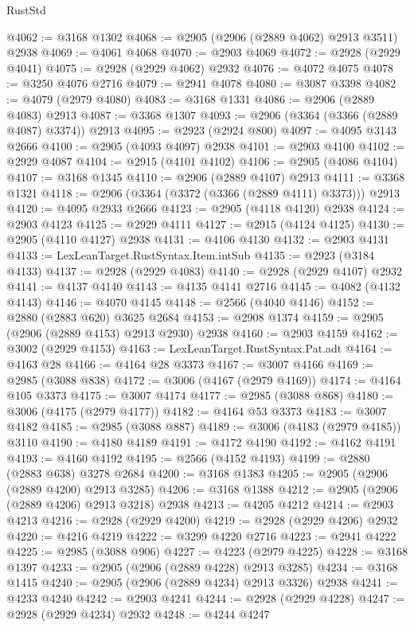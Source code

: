 \begin{lexlean}{RustStd}
\begin{coremodule}
{\begin{coremodule}
{{{{{{{{{{{{{{{{{{{{{{{{{{{{{{{{{{{{{{{{{{{{{{{{{{{{{{{{{{{{{{{{{{{{{{{{{{{{{{@4062 := @3168 @1302
@4068 := @2905 (@2906 (@2889 @4062) @2913 @3511) @2938
@4069 := @4061 @4068
@4070 := @2903 @4069
@4072 := @2928 (@2929 @4041)
@4075 := @2928 (@2929 @4062) @2932
@4076 := @4072 @4075
@4078 := @3250 @4076 @2716
@4079 := @2941 @4078
@4080 := @3087 @3398
@4082 := @4079 (@2979 @4080)
@4083 := @3168 @1331
@4086 := @2906 (@2889 @4083) @2913
@4087 := @3368 @1307
@4093 := @2906 (@3364 (@3366 (@2889 @4087) @3374)) @2913
@4095 := @2923 (@2924 @800)
@4097 := @4095 @3143 @2666
@4100 := @2905 (@4093 @4097) @2938
@4101 := @2903 @4100
@4102 := @2929 @4087
@4104 := @2915 (@4101 @4102)
@4106 := @2905 (@4086 @4104)
@4107 := @3168 @1345
@4110 := @2906 (@2889 @4107) @2913
@4111 := @3368 @1321
@4118 := @2906 (@3364 (@3372 (@3366 (@2889 @4111) @3373))) @2913
@4120 := @4095 @2933 @2666
@4123 := @2905 (@4118 @4120) @2938
@4124 := @2903 @4123
@4125 := @2929 @4111
@4127 := @2915 (@4124 @4125)
@4130 := @2905 (@4110 @4127) @2938
@4131 := @4106 @4130
@4132 := @2903 @4131
@4133 := LexLeanTarget.RustSyntax.Item.intSub
@4135 := @2923 (@3184 @4133)
@4137 := @2928 (@2929 @4083)
@4140 := @2928 (@2929 @4107) @2932
@4141 := @4137 @4140
@4143 := @4135 @4141 @2716
@4145 := @4082 (@4132 @4143)
@4146 := @4070 @4145
@4148 := @2566 (@4040 @4146)
@4152 := @2880 (@2883 @620) @3625 @2684
@4153 := @2908 @1374
@4159 := @2905 (@2906 (@2889 @4153) @2913 @2930) @2938
@4160 := @2903 @4159
@4162 := @3002 (@2929 @4153)
@4163 := LexLeanTarget.RustSyntax.Pat.adt
@4164 := @4163 @28
@4166 := @4164 @28 @3373
@4167 := @3007 @4166
@4169 := @2985 (@3088 @838)
@4172 := @3006 (@4167 (@2979 @4169))
@4174 := @4164 @105 @3373
@4175 := @3007 @4174
@4177 := @2985 (@3088 @868)
@4180 := @3006 (@4175 (@2979 @4177))
@4182 := @4164 @53 @3373
@4183 := @3007 @4182
@4185 := @2985 (@3088 @887)
@4189 := @3006 (@4183 (@2979 @4185)) @3110
@4190 := @4180 @4189
@4191 := @4172 @4190
@4192 := @4162 @4191
@4193 := @4160 @4192
@4195 := @2566 (@4152 @4193)
@4199 := @2880 (@2883 @638) @3278 @2684
@4200 := @3168 @1383
@4205 := @2905 (@2906 (@2889 @4200) @2913 @3285)
@4206 := @3168 @1388
@4212 := @2905 (@2906 (@2889 @4206) @2913 @3218) @2938
@4213 := @4205 @4212
@4214 := @2903 @4213
@4216 := @2928 (@2929 @4200)
@4219 := @2928 (@2929 @4206) @2932
@4220 := @4216 @4219
@4222 := @3299 @4220 @2716
@4223 := @2941 @4222
@4225 := @2985 (@3088 @906)
@4227 := @4223 (@2979 @4225)
@4228 := @3168 @1397
@4233 := @2905 (@2906 (@2889 @4228) @2913 @3285)
@4234 := @3168 @1415
@4240 := @2905 (@2906 (@2889 @4234) @2913 @3326) @2938
@4241 := @4233 @4240
@4242 := @2903 @4241
@4244 := @2928 (@2929 @4228)
@4247 := @2928 (@2929 @4234) @2932
@4248 := @4244 @4247
}}}}}}}}}}}}}}}}}}}}}}}}}}}}}}}}}}}}}}}}}}}}}}}}}}}}}}}}}}}}}}}}}}}}}}}}}}}}}}
\end{coremodule}}
\end{coremodule}
\end{lexlean}
